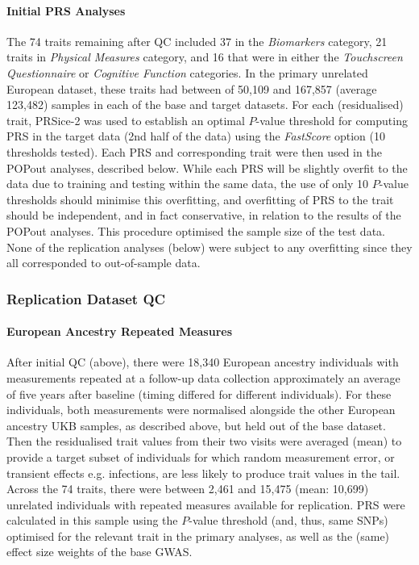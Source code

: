 \documentclass[12pt]{zHenriquesLab-StyleBioRxiv}
\begin{document}
\paragraph*{Initial PRS Analyses}
The 74 traits remaining after QC included 37 in the \textit{Biomarkers} category, 
21 traits in \textit{Physical Measures} category, and 16 that were in either 
the \textit{Touchscreen Questionnaire} or \textit{Cognitive Function} categories.  
In the primary unrelated European dataset, these traits had between of 50,109 and 167,857 
(average 123,482) samples in each of the base and target datasets. For each (residualised) trait, 
PRSice-2 \cite{prsice} was used to establish an optimal $P$-value threshold for computing PRS in 
the target data (2nd half of the data) using the \textit{FastScore} option (10 thresholds tested). 
Each PRS and corresponding trait were then used in the POPout analyses, described below. 
While each PRS will be slightly overfit to the data due to training and testing within the same data, 
the use of only 10 $P$-value thresholds should minimise this overfitting, and overfitting of PRS 
to the trait should be independent, and in fact conservative, in relation to the results of 
the POPout analyses. This procedure optimised the sample size of the test data. None of the replication 
analyses (below) were subject to any overfitting since they all corresponded to out-of-sample data. 
%
\subsubsection*{Replication Dataset QC} \label{sec:methods:rqc} 
\paragraph*{European Ancestry Repeated Measures}
After initial QC (above), there were 18,340 European ancestry individuals 
with measurements repeated at a follow-up data collection approximately an average
of five years after baseline (timing differed for different individuals). For these individuals, both measurements were normalised alongside 
the other European ancestry UKB samples, as described above, but held out of the base dataset. Then 
the residualised trait values from their two visits were averaged (mean) to provide a 
target subset of individuals for which random measurement error, or transient 
effects e.g. infections, are less likely to produce trait values in the tail. 
Across the 74 traits, there were between 2,461 and 15,475 (mean: 10,699) unrelated 
individuals with repeated measures available for replication.  PRS were calculated in this sample 
using the $P$-value threshold (and, thus, same SNPs) optimised for the relevant 
trait in the primary analyses, as well as the (same) effect size weights of the base GWAS. 
\end{document}
